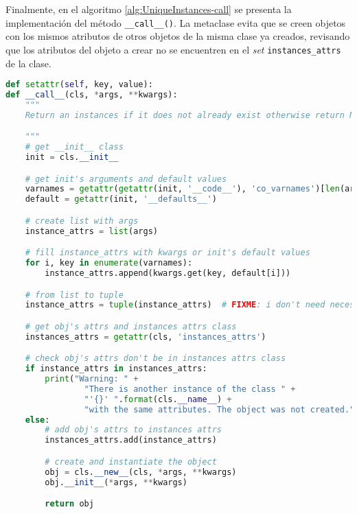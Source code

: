 Finalmente, en el algoritmo \ref{alg:UniqueInstances-call} se presenta la implementación del método \verb|__call__()|. La metaclase evita que se creen objetos con los mismos atributos de otros objetos de la misma clase ya creados, revisando que los atributos del objeto a crear no se encuentren en el \emph{set} \verb|instances_attrs| de la clase.\\

\begin{lstlisting}[language=Python,caption=Método \texttt{\_\_call\_\_} de la metaclase \texttt{UniqueInstances}.,label=alg:UniqueInstances-call, frame=single]
    def setattr(self, key, value):
def __call__(cls, *args, **kwargs):
    """
    Return an instances if it does not already exist otherwise return None

    """
    # get __init__ class
    init = cls.__init__

    # get init's arguments and default values
    varnames = getattr(getattr(init, '__code__'), 'co_varnames')[len(args) + 1:]
    default = getattr(init, '__defaults__')

    # create list with args
    instance_attrs = list(args)

    # fill instance_attrs with kwargs or init's default values
    for i, key in enumerate(varnames):
        instance_attrs.append(kwargs.get(key, default[i]))

    # from list to tuple
    instance_attrs = tuple(instance_attrs)  # FIXME: i don't need necessary check all params

    # get obj's attrs and instances attrs class
    instances_attrs = getattr(cls, 'instances_attrs')

    # check obj's attrs don't be in instances attrs class
    if instance_attrs in instances_attrs:
        print("Warning: " +
                "There is another instance of the class " +
                "'{}' ".format(cls.__name__) +
                "with the same attributes. The object was not created.")
    else:
        # add obj's attrs to instances attrs
        instances_attrs.add(instance_attrs)

        # create and instantiate the object
        obj = cls.__new__(cls, *args, **kwargs)
        obj.__init__(*args, **kwargs)

        return obj
\end{lstlisting}